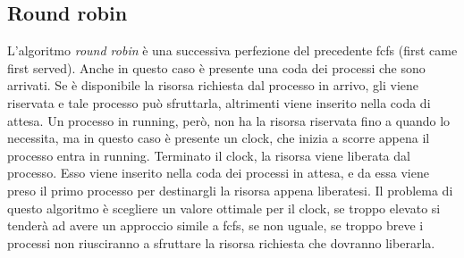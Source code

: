\documentclass[Lau, oneside]{sapthesis}%
\begin{document}
\subsection{Round robin}
\label{subsec:rr}
L'algoritmo \textit{round robin} è una successiva perfezione del precedente fcfs (first came first served).
Anche in questo caso è presente una coda dei processi che sono arrivati.
Se è disponibile la risorsa richiesta dal processo in arrivo, gli viene riservata e tale processo può sfruttarla, altrimenti viene inserito nella coda di attesa.
Un processo in running, però, non ha la risorsa riservata fino a quando lo necessita, ma in questo caso è presente un clock, che inizia a scorre appena il processo entra in running.
Terminato il clock, la risorsa viene liberata dal processo.
Esso viene inserito nella coda dei processi in attesa, e da essa viene preso il primo processo per destinargli la risorsa appena liberatesi.
Il problema di questo algoritmo è scegliere un valore ottimale per il clock, se troppo elevato si tenderà ad avere un approccio simile a fcfs, se non uguale, se troppo breve i processi non riusciranno a sfruttare la risorsa richiesta che dovranno liberarla.
\end{document}
